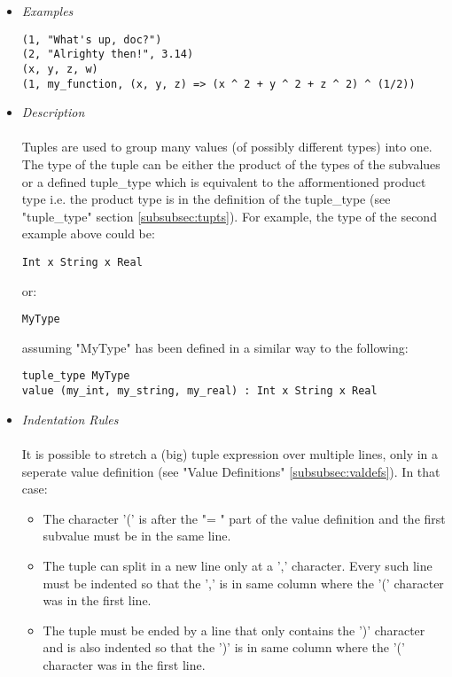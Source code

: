 \documentclass{article}
\begin{document}
\begin{itemize}

\item \textit{Examples}
\begin{verbatim}
(1, "What's up, doc?")
(2, "Alrighty then!", 3.14)
(x, y, z, w)
(1, my_function, (x, y, z) => (x ^ 2 + y ^ 2 + z ^ 2) ^ (1/2))
\end{verbatim}

\item \textit{Description} \\\\
Tuples are used to group many values (of possibly different types) into one.
The type of the tuple can be either the product of the types of the subvalues or a
defined tuple\_type which is equivalent to the afformentioned product type i.e.
the product type is in the definition of the tuple\_type (see "tuple\_type"
section \ref{subsubsec:tupts}). For example, the type of the second example above 
could be:
\begin{verbatim}
Int x String x Real
\end{verbatim}
or:
\begin{verbatim}
MyType
\end{verbatim}
assuming "MyType" has been defined in a similar way to the following:
\begin{verbatim}
tuple_type MyType
value (my_int, my_string, my_real) : Int x String x Real
\end{verbatim}

\item \textit{Indentation Rules} \\\\
It is possible to stretch a (big) tuple expression over multiple lines, only in a
seperate value definition (see "Value Definitions" \ref{subsubsec:valdefs}).
In that case:
\begin{itemize}
\item
The character '(' is after the "= " part of the value definition
and the first subvalue must be in the same line.

\item
The tuple can split in a new line only at a ',' character. Every such line must
be indented so that the ',' is in same column where the '(' character was in
the first line.

\item
The tuple must be ended by a line that only contains the ')' character and is 
also indented so that the ')' is in same column where the '(' character was in
the first line.


\end{itemize}
\end{itemize}
\end{document}
